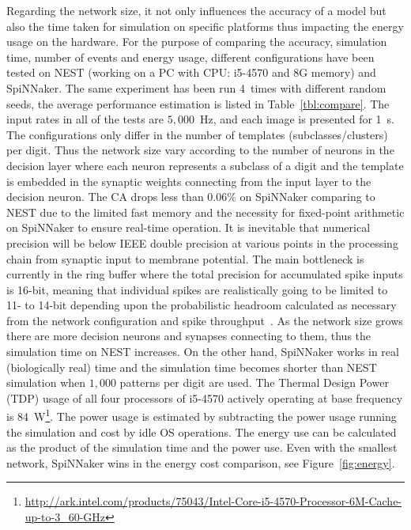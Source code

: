 \documentclass{frontiersENG} %
\begin{document}
Regarding the network size, it not only influences the accuracy of a model but also the time taken for simulation on specific platforms thus impacting the energy usage on the hardware.
For the purpose of comparing the accuracy, simulation time, number of events and energy usage, different configurations have been tested on NEST (working on a PC with CPU: i5-4570 and 8G memory) and SpiNNaker.
The same experiment has been run 4~times with different random seeds, the average performance estimation is listed in Table~\ref{tbl:compare}.
The input rates in all of the tests are $5,000$~Hz, and each image is presented for 1~s.
The configurations only differ in the number of templates (subclasses/clusters) per digit.
Thus the network size vary according to the number of neurons in the decision layer where each neuron represents a subclass of a digit and the template is embedded in the synaptic weights connecting from the input layer to the decision neuron.
The CA drops less than $0.06\%$ on SpiNNaker comparing to NEST due to the limited fast memory and the necessity for fixed-point arithmetic on SpiNNaker to ensure real-time operation.
It is inevitable that numerical precision will be below IEEE double precision at various points in the processing chain from synaptic input to membrane potential.
The main bottleneck is currently in the ring buffer where the total precision for accumulated spike inputs is 16-bit, meaning that individual spikes are realistically going to be limited to 11- to 14-bit depending upon the probabilistic headroom calculated as necessary from the network configuration and spike throughput~\citep{Hopkins2015Accuracy}.
As the network size grows there are more decision neurons and synapses connecting to them, thus the simulation time on NEST increases.
On the other hand, SpiNNaker works in real (biologically real) time and the simulation time becomes shorter than NEST simulation when $1,000$ patterns per digit are used.
The Thermal Design Power (TDP) usage of all four processors of i5-4570 actively operating at base frequency is 84~W\footnote{\url{http://ark.intel.com/products/75043/Intel-Core-i5-4570-Processor-6M-Cache-up-to-3_60-GHz}}.
The power usage is estimated by subtracting the power usage running the simulation and cost by idle OS operations.
The energy use can be calculated as the product of the simulation time and the power use.
Even with the smallest network, SpiNNaker wins in the energy cost comparison, see Figure~\ref{fig:energy}.
\end{document}
